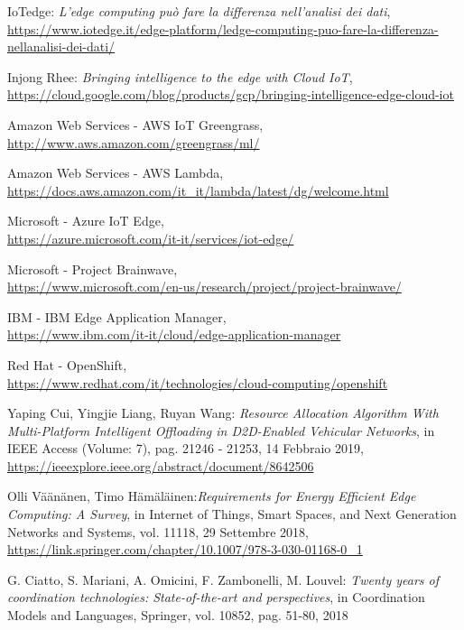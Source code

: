 \documentclass[a4paper,12pt,oneside]{book}
\begin{document}
\begin{thebibliography}{9}
	
	IoTedge: \textit{L’edge computing può fare la differenza nell’analisi dei dati},
	\url{https://www.iotedge.it/edge-platform/ledge-computing-puo-fare-la-differenza-nellanalisi-dei-dati/}
	
	Injong Rhee: \textit{Bringing intelligence to the edge with Cloud IoT},
	\\\url{https://cloud.google.com/blog/products/gcp/bringing-intelligence-edge-cloud-iot}
	
	Amazon Web Services - AWS IoT Greengrass,
	\\\url{http://www.aws.amazon.com/greengrass/ml/}
	
	Amazon Web Services - AWS Lambda,
	\\\url{https://docs.aws.amazon.com/it_it/lambda/latest/dg/welcome.html}
	
	Microsoft - Azure IoT Edge,
	\\\url{https://azure.microsoft.com/it-it/services/iot-edge/}
	
	Microsoft - Project Brainwave,
	\\\url{https://www.microsoft.com/en-us/research/project/project-brainwave/}
	
	IBM - IBM Edge Application Manager,
	\\\url{https://www.ibm.com/it-it/cloud/edge-application-manager}
	
	Red Hat - OpenShift,
	\\\url{https://www.redhat.com/it/technologies/cloud-computing/openshift}
	
	Yaping Cui, Yingjie Liang, Ruyan Wang: \textit{Resource Allocation Algorithm With Multi-Platform Intelligent Offloading in D2D-Enabled Vehicular Networks}, in IEEE Access (Volume: 7), pag. 21246 - 21253, 14 Febbraio 2019,
	\\\url{https://ieeexplore.ieee.org/abstract/document/8642506}
	
	Olli Väänänen, Timo Hämäläinen:\textit{Requirements for Energy Efficient Edge Computing: A Survey}, in Internet of Things, Smart Spaces, and Next Generation Networks and Systems, vol. 11118,  29 Settembre 2018,
	\\\url{https://link.springer.com/chapter/10.1007/978-3-030-01168-0_1}
	
	G. Ciatto, S. Mariani, A. Omicini, F. Zambonelli, M. Louvel: \textit{Twenty years of coordination technologies: State-of-the-art and perspectives}, in Coordination Models and Languages, Springer, vol. 10852, pag. 51-80, 2018
	

\end{thebibliography}
\end{document}
